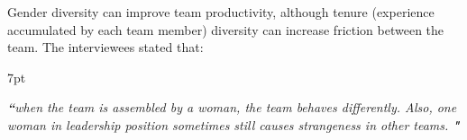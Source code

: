 \documentclass{IEEEcsmag}
\newenvironment{formal}{%
  \def\FrameCommand{%
    \hspace{1pt}%
    {\color{formalshade}\vrule width 2pt}%
    {\color{formalshade}\vrule width 4pt}%
    \colorbox{formalshade}%
  }%
  \MakeFramed{\advance\hsize-\width\FrameRestore}%
  \noindent\hspace{-4.55pt}%
  \begin{adjustwidth}{}{7pt}%
  \vspace{2pt}\vspace{2pt}%
}
{%
  \vspace{2pt}\end{adjustwidth}\endMakeFramed%
}
\begin{document}

Gender diversity can improve team productivity, although tenure (experience accumulated by each team member) diversity can increase friction between the team. The interviewees stated that:

\begin{formal}
\emph{{\bf``}when the team is assembled by a woman, the team behaves differently. Also, one woman in leadership position sometimes still causes strangeness in other teams. {\bf"}}
\end{formal} 

\end{document}
